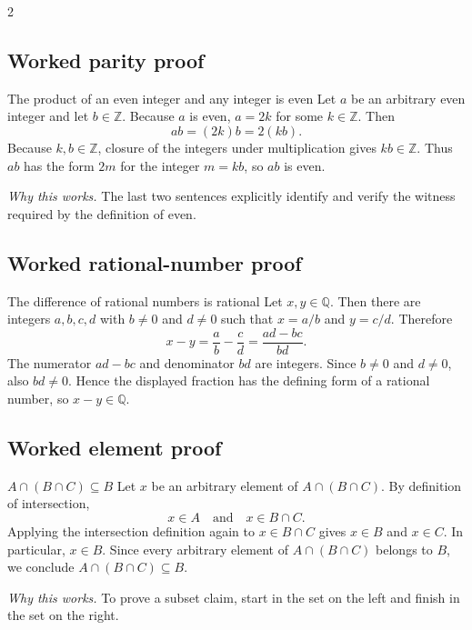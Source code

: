 \documentclass[10pt]{article}
\newcommand{\why}{\textit{Why this works.} }
\newcommand{\Z}{\mathbb Z}
\newcommand{\Q}{\mathbb Q}
\begin{document}
\begin{multicols}{2}
\raggedcolumns
\subsection*{Worked parity proof}

\begin{workedbox}{The product of an even integer and any integer is even}
Let $a$ be an arbitrary even integer and let $b\in\Z$. Because $a$ is even,
$a=2k$ for some $k\in\Z$. Then
\[
 ab=(2k)b=2(kb).
\]
Because $k,b\in\Z$, closure of the integers under multiplication gives
$kb\in\Z$. Thus $ab$ has the form $2m$ for the integer $m=kb$, so $ab$ is
even.

\why The last two sentences explicitly identify and verify the witness required
by the definition of even.
\end{workedbox}

\subsection*{Worked rational-number proof}

\begin{workedbox}{The difference of rational numbers is rational}
Let $x,y\in\Q$. Then there are integers $a,b,c,d$ with $b\ne0$ and $d\ne0$
such that $x=a/b$ and $y=c/d$. Therefore
\[
 x-y=\frac{a}{b}-\frac{c}{d}=\frac{ad-bc}{bd}.
\]
The numerator $ad-bc$ and denominator $bd$ are integers. Since $b\ne0$ and
$d\ne0$, also $bd\ne0$. Hence the displayed fraction has the defining form of
a rational number, so $x-y\in\Q$.
\end{workedbox}

\columnbreak
\subsection*{Worked element proof}

\begin{workedbox}{$A\cap(B\cap C)\subseteq B$}
Let $x$ be an arbitrary element of $A\cap(B\cap C)$. By definition of
intersection,
\[
 x\in A\quad\text{and}\quad x\in B\cap C.
\]
Applying the intersection definition again to $x\in B\cap C$ gives $x\in B$
and $x\in C$. In particular, $x\in B$. Since every arbitrary element of
$A\cap(B\cap C)$ belongs to $B$, we conclude
$A\cap(B\cap C)\subseteq B$.

\why To prove a subset claim, start in the set on the left and finish in the
set on the right.
\end{workedbox}


\end{multicols}
\end{document}
